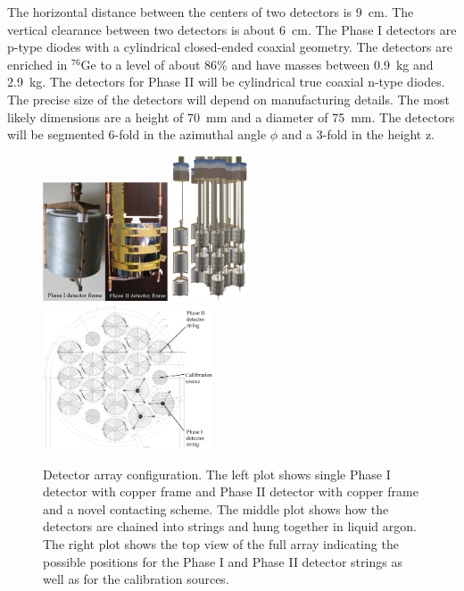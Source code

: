 The horizontal distance between the centers of two detectors is 9~cm. The vertical clearance between two detectors is about 6~cm. The Phase I detectors are p-type diodes with a cylindrical closed-ended coaxial geometry. The detectors are enriched in $^{76}$Ge to a level of about 86\% and have masses between 0.9~kg and 2.9~kg. The detectors for Phase II will be cylindrical true coaxial n-type diodes. The precise size of the detectors will depend on manufacturing details. The most likely dimensions are a height of 70~mm and a diameter of 75~mm. The detectors will be segmented 6-fold in the azimuthal angle $\phi$ and a 3-fold in the height z. 

\begin{figure}[tbhp]
  \centering
  \includegraphics[width=0.33\textwidth]{detectorFrame}
  \includegraphics[width=0.2\textwidth]{array}   \includegraphics[width=0.45\textwidth]{arrayTop}
  \caption{Detector array configuration. The left plot shows single     Phase I detector with copper frame and Phase II detector with     copper frame and a novel contacting scheme. The middle plot shows     how the detectors are chained into strings and hung together in     liquid argon.  The right plot shows the top view of the full array     indicating the possible positions for the Phase I and Phase II     detector strings as well as for the calibration sources.}
  \label{fig:array}
\end{figure}

